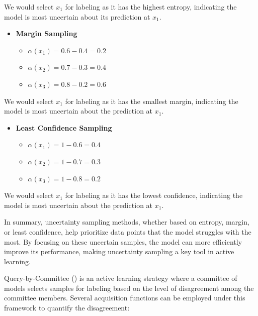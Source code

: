 \documentclass[
  letterpaper,
  numbers=noenddot,
  DIV=11]{scrreprt}
\providecommand{\tightlist}{%
  \setlength{\itemsep}{0pt}\setlength{\parskip}{0pt}}\usepackage{longtable,booktabs,array}
\theoremstyle{definition}
\theoremstyle{plain}
\theoremstyle{plain}
\theoremstyle{remark}
\begin{document}
We would select \(x_1\) for labeling as it has the highest entropy,
indicating the model is most uncertain about its prediction at \(x_1\).

\begin{itemize}
\tightlist
\item
  \textbf{Margin Sampling}

  \begin{itemize}
  \tightlist
  \item
    \(\alpha(x_1) = 0.6 - 0.4 = 0.2\)
  \item
    \(\alpha(x_2) = 0.7 - 0.3 = 0.4\)
  \item
    \(\alpha(x_3) = 0.8 - 0.2 = 0.6\)
  \end{itemize}
\end{itemize}

We would select \(x_1\) for labeling as it has the smallest margin,
indicating the model is most uncertain about the prediction at \(x_1\).

\begin{itemize}
\tightlist
\item
  \textbf{Least Confidence Sampling}

  \begin{itemize}
  \tightlist
  \item
    \(\alpha(x_1) = 1 - 0.6 = 0.4\)
  \item
    \(\alpha(x_2) = 1 - 0.7 = 0.3\)
  \item
    \(\alpha(x_3) = 1 - 0.8 = 0.2\)
  \end{itemize}
\end{itemize}

We would select \(x_1\) for labeling as it has the lowest confidence,
indicating the model is most uncertain about the prediction at \(x_1\).

In summary, uncertainty sampling methods, whether based on entropy,
margin, or least confidence, help prioritize data points that the model
struggles with the most. By focusing on these uncertain samples, the
model can more efficiently improve its performance, making uncertainty
sampling a key tool in active learning.

Query-by-Committee () is
an active learning strategy where a committee of models selects samples
for labeling based on the level of disagreement among the committee
members. Several acquisition functions can be employed under this
framework to quantify the disagreement:
\end{document}
